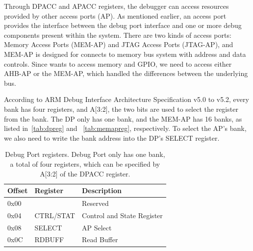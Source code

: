 Through DPACC and APACC registers, the debugger can access resources provided by other access ports (AP).  As mentioned earlier, an access port provides the interface between the debug port interface and one or more debug components present within the system. There are two kinds of access ports: Memory Access Ports (MEM-AP) and JTAG Access Ports (JTAG-AP), and MEM-AP is designed for connects to memory bus system with address and data controls.  Since \name wants to access memory and GPIO, we need to access either AHB-AP or the MEM-AP, which handled the differences between the underlying bus.



%
%

 According to ARM Debug Interface Architecture Specification v5.0 to v5.2, every bank has four registers, and A[3:2], the two bits are used to select the register from the bank. The DP only has one bank, and the MEM-AP has 16 banks, as listed in~\autoref{tab:dpreg} and ~\autoref{tab:memapreg}, respectively. To select the AP's bank, we also need to write the bank address into the DP's SELECT register.




\begin{center}
	\begin{table}
		\small
		\begin{tabular}{l l l} 
			\hline
			Offset & Register &  Description  \\ 
			\hline
			0x00 & & Reserved \\
			\hline
			0x04 & CTRL/STAT & Control and State Register \\
			\hline
			0x08 & SELECT & AP Select \\
			\hline
			0x0C & RDBUFF & Read Buffer\\
			\hline
		\end{tabular}
		\caption{Debug Port registers. Debug Port only has one bank, a total of four registers, which can be specified by A[3:2] of the DPACC register. }
		\label{tab:dpreg}
	\end{table}
\end{center}


